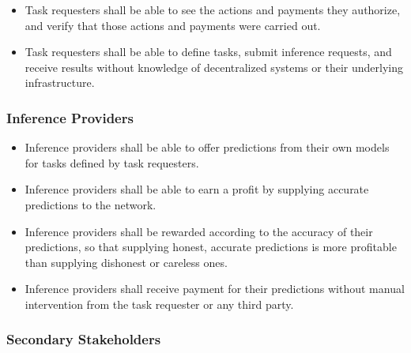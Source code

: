 \documentclass[12pt]{article}
\newcounter{srnum} %
\begin{document}
\begin{itemize}
\item[SR\refstepcounter{srnum}\thesrnum \label{SR_Transparency}] Task requesters shall be able to see the actions and payments they authorize, and verify that those actions and payments were carried out.

\item[SR\refstepcounter{srnum}\thesrnum \label{SR_EaseOfUse}] Task requesters shall be able to define tasks, submit inference requests, and receive results without knowledge of decentralized systems or their underlying infrastructure.

\end{itemize}

\subsubsection*{Inference Providers}

\noindent \begin{itemize}

\item[SR\refstepcounter{srnum}\thesrnum \label{SR_ProviderParticipation}] Inference providers shall be able to offer predictions from their own models for tasks defined by task requesters.

\item[SR\refstepcounter{srnum}\thesrnum \label{SR_ProviderProfit}] Inference providers shall be able to earn a profit by supplying accurate predictions to the network.

\item[SR\refstepcounter{srnum}\thesrnum \label{SR_RewardAccuracy}] Inference providers shall be rewarded according to the accuracy of their predictions, so that supplying honest, accurate predictions is more profitable than supplying dishonest or careless ones.

\item[SR\refstepcounter{srnum}\thesrnum \label{SR_AutomaticPayment}] Inference providers shall receive payment for their predictions without manual intervention from the task requester or any third party.

\end{itemize}

\subsubsection*{Secondary Stakeholders}
\end{document}
